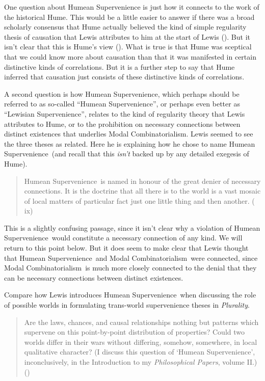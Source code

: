 \documentclass[
  11pt,
  letterpaper,
  DIV=11,
  numbers=noendperiod,
  twoside]{scrartcl}
\begin{document}
One question about Humean Supervenience is just how it connects to the
work of the historical Hume. This would be a little easier to answer if
there was a broad scholarly consensus that Hume actually believed the
kind of simple regularity thesis of causation that Lewis attributes to
him at the start of Lewis (). But it
isn't clear that this is Hume's view
(). What is true is that Hume
was sceptical that we could know more about causation than that it was
manifested in certain distinctive kinds of correlations. But it is a
further step to say that Hume inferred that causation just consists of
these distinctive kinds of correlations.

A second question is how Humean Supervenience, which perhaps should be
referred to as so-called ``Humean Supervenience'', or perhaps even
better as ``Lewisian Supervenience'', relates to the kind of regularity
theory that Lewis attributes to Hume, or to the prohibition on necessary
connections between distinct existences that underlies Modal
Combinatorialism. Lewis seemed to see the three theses as related. Here
he is explaining how he chose to name Humean Supervenience~(and recall
that this \emph{isn't} backed up by any detailed exegesis of Hume).

\begin{quote}
Humean Supervenience~is named in honour of the great denier of necessary
connections. It is the doctrine that all there is to the world is a vast
mosaic of local matters of particular fact just one little thing and
then another. ( ix)
\end{quote}

This is a slightly confusing passage, since it isn't clear why a
violation of Humean Supervenience~would constitute a necessary
connection of any kind. We will return to this point below. But it does
seem to make clear that Lewis thought that Humean Supervenience~and
Modal Combinatorialism~were connected, since Modal Combinatorialism~is
much more closely connected to the denial that they can be necessary
connections between distinct existences.

Compare how Lewis introduces Humean Supervenience~when discussing the
role of possible worlds in formulating trans-world supervenience theses
in \emph{Plurality}.

\begin{quote}
Are the laws, chances, and causal relationships nothing but patterns
which supervene on this point-by-point distribution of properties? Could
two worlds differ in their wars without differing, somehow, somewhere,
in local qualitative character? (I discuss this question of `Humean
Supervenience', inconclusively, in the Introduction to my
\emph{Philosophical Papers}, volume II.)
()
\end{quote}
\end{document}
